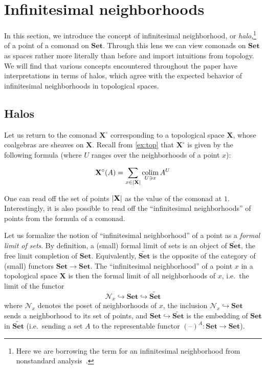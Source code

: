 \documentclass[11pt, oneside, article]{memoir}
\makeatletter
\theoremstyle{plain}
\theoremstyle{definition}
\theoremstyle{remark}
\def\theHsection{\theHchapter.\arabic{section}}
\def\theHtheorem{\theHsection.\arabic{theorem}}
\def\theHcorollary{\theHsection.\arabic{theorem}}
\def\theHproposition{\theHsection.\arabic{theorem}}
\def\theHlemma{\theHsection.\arabic{theorem}}
\def\theHconjecture{\theHsection.\arabic{theorem}}
\def\theHdefinition{\theHsection.\arabic{theorem}}
\def\theHmyremark{\theHsection.\arabic{theorem}}
\def\theHmyexample{\theHsection.\arabic{theorem}}
\def\theHmyconvention{\theHsection.\arabic{theorem}}
\def\theHmywarning{\theHsection.\arabic{theorem}}
\def\theHmycounterexample{\theHsection.\arabic{theorem}}
\def\theHdef{\theHsection.\arabic{theorem}}
\def\theHrem{\theHsection.\arabic{theorem}}
\let\@origchapter\chapter
\renewcommand{\thechapter}{\arabic{chapter}}
\newif\if@inappendixmode
\newcommand{\@syncthmdisplay}{%
  \global\let\thedef\thetheorem
  \global\let\therem\thetheorem
  \global\let\thedefinition\thetheorem
  \global\let\thelemma\thetheorem
  \global\let\thecorollary\thetheorem
  \global\let\theproposition\thetheorem
  \global\let\theconjecture\thetheorem
  \global\let\themyremark\thetheorem
  \global\let\themyexample\thetheorem
  \global\let\themyconvention\thetheorem
  \global\let\themywarning\thetheorem
  \global\let\themycounterexample\thetheorem
}
\newcommand{\@syncthmH}[1]{%
  \gdef\theHtheorem{#1}\gdef\theHcorollary{#1}\gdef\theHproposition{#1}%
  \gdef\theHlemma{#1}\gdef\theHconjecture{#1}\gdef\theHdefinition{#1}%
  \gdef\theHmyremark{#1}\gdef\theHmyexample{#1}\gdef\theHmyconvention{#1}%
  \gdef\theHmywarning{#1}\gdef\theHmycounterexample{#1}%
  \gdef\theHdef{#1}\gdef\theHrem{#1}%
}
\renewcommand{\chapter}{%
  \if@inappendixmode%
    \renewcommand{\thechapter}{\Alph{chapter}}%
    \renewcommand{\theHchapter}{\Alph{chapter}}%
    \counterwithout*{theorem}{section}%
    \gdef\thetheorem{\thechapter.\arabic{theorem}}%
    \@syncthmdisplay
    \@syncthmH{\theHchapter.\arabic{theorem}}%
  \else
    \renewcommand{\thechapter}{\arabic{chapter}}%
    \renewcommand{\theHchapter}{\arabic{chapter}}%
  \fi
  \@origchapter
}
\DeclareMathOperator*{\colim}{colim}
\DeclarePairedDelimiter{\abs}{\lvert}{\rvert}
\newcommand{\dash}{{\mathord{\text{--}}}}
\newcommand{\namedcat}[1]{\mathbf{#1}}
\newcommand{\spa}[1]{\mathbf{#1}}
\newcommand{\Set}{\namedcat{Set}}
\newcommand{\pts}[1]{{\abs{#1}}}
\newcommand{\xA}{A}
\newcommand{\xU}{U}
\newcommand{\tX}{\spa{X}}
\newcommand{\cX}{\toptocmd{\tX}}
\newcommand{\toptocmd}[1]{{{#1}^\circ}}
\newcommand{\neighbors}[1]{\mathcal{N}_{#1}}
\makeatother
\begin{document}
\chaptertocspace
\chapter{Infinitesimal neighborhoods}\label{sec:halos}

In this section, we introduce the concept of infinitesimal
neighborhood, or \emph{halo},\footnote{Here we are borrowing the term
  for an infinitesimal neighborhood from nonstandard
  analysis~\cite{goldblatt}.} of a point of a comonad on
$\Set$. Through this lens we can view comonads on $\Set$ as spaces
rather more literally than before and import intuitions from
topology. We will find that various concepts encountered throughout
the paper have interpretations in terms of halos, which agree with the
expected behavior of infinitesimal neighborhoods in topological spaces.

\section{Halos}

Let us return to the comonad $\cX$ corresponding to a topological
space $\tX$, whose coalgebras are sheaves on $\tX$. Recall from
\cref{ex:top} that $\cX$ is given by the following formula (where $U$
ranges over the neighborhoods of a point $x$):

\begin{equation}\label{eq:comonadformula}
  \cX(\xA) = \sum_{x\in \pts{\tX}} \colim_{U \ni x} \xA^\xU
\end{equation}

\noindent
One can read off the set of points $\pts{\tX}$ as the value of the
comonad at $1$. Interestingly, it is also possible to read off the
``infinitesimal neighborhoods'' of points from the formula of a
comonad.

Let us formalize the notion of ``infinitesimal neighborhood'' of a
point as a \emph{formal limit of sets}. By definition, a (small)
formal limit of sets is an object of $\widetilde{\Set}$, the free
limit completion of $\Set$. Equivalently, $\widetilde{\Set}$ is the
opposite of the category of (small) functors $\Set \to \Set$. The
``infinitesimal neighborhood'' of a point $x$ in a topological space
$\tX$ is then the formal limit of all neighborhoods of $x$, i.e.\ the
limit of the functor
\begin{equation}\label{eq:comonadlimit}
  {\neighbors{x}} \hookrightarrow \Set \hookrightarrow \widetilde{\Set}
\end{equation}
where $\neighbors{x}$ denotes the poset of neighborhoods of $x$, the
inclusion $\neighbors{x} \hookrightarrow \Set$ sends a neighborhood to
its set of points, and $\Set \hookrightarrow \widetilde{\Set}$ is the embedding of
$\Set$ in $\widetilde{\Set}$ (i.e.\ sending a set $\xA$ to the
representable functor $(\dash)^\xA \colon \Set \to \Set$).
\end{document}
